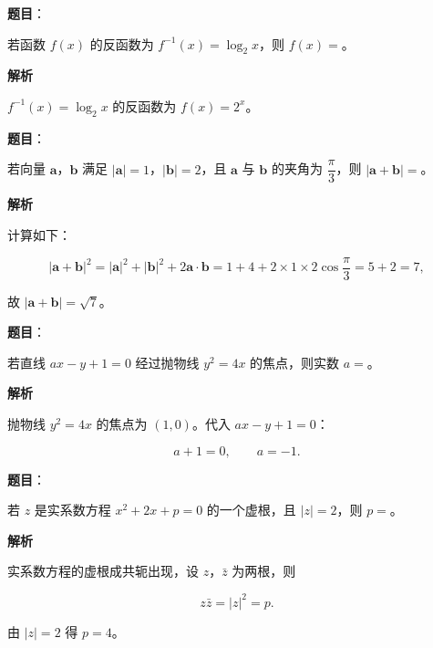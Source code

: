 \begin{answer}

\textbf{题目}：

若函数 $f(x)$ 的反函数为 $f^{-1}(x)=\log_2x$，则 $f(x)=$\gkblank{}。

\textbf{解析}

$f^{-1}(x)=\log_2x$ 的反函数为 $f(x)=2^x$。


\end{answer}
\begin{answer}

\textbf{题目}：

若向量 $\boldsymbol a$，$\boldsymbol b$ 满足 $|\boldsymbol a|=1$，$|\boldsymbol b|=2$，且 $\boldsymbol a$ 与 $\boldsymbol b$ 的夹角为 $\dfrac{\pi}3$，则 $|\boldsymbol a+\boldsymbol b|=$\gkblank{}。

\textbf{解析}

计算如下：

\nopagebreak[4]
\[|\boldsymbol a+\boldsymbol b|^2=|\boldsymbol a|^2+|\boldsymbol b|^2+2\boldsymbol a\cdot\boldsymbol b=1+4+2\times1\times2\cos\frac{\pi}3=5+2=7,\]

故 $|\boldsymbol a+\boldsymbol b|=\sqrt7$。


\end{answer}
\begin{answer}

\textbf{题目}：

若直线 $ax-y+1=0$ 经过抛物线 $y^2=4x$ 的焦点，则实数 $a=$\gkblank{}。

\textbf{解析}

抛物线 $y^2=4x$ 的焦点为 $(1,0)$。代入 $ax-y+1=0$：

\nopagebreak[4]
\[a+1=0,\qquad a=-1.\]


\end{answer}
\begin{answer}

\textbf{题目}：

若 $z$ 是实系数方程 $x^2+2x+p=0$ 的一个虚根，且 $|z|=2$，则 $p=$\gkblank{}。

\textbf{解析}

实系数方程的虚根成共轭出现，设 $z$，$\bar z$ 为两根，则

\nopagebreak[4]
\[z\bar z=|z|^2=p.\]

由 $|z|=2$ 得 $p=4$。


\end{answer}
